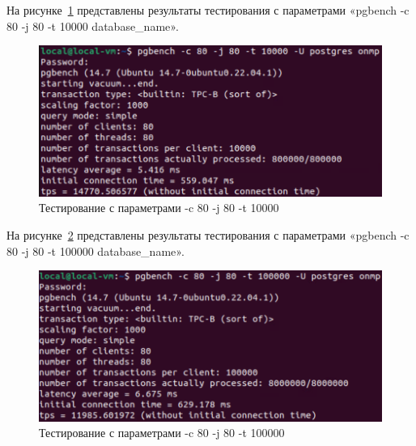 На рисунке~\ref{fig:b16} представлены результаты тестирования с параметрами «pgbench -c 80 -j 80 -t 10000 database\_name».

\begin{figure}
    \includegraphics[width=16.5cm]{inc/test2_8}
    \caption{Тестирование с параметрами -c 80 -j 80 -t 10000}
    \label{fig:b16}
\end{figure}

На рисунке~\ref{fig:b17} представлены результаты тестирования с параметрами «pgbench -c 80 -j 80 -t 100000 database\_name».

\begin{figure}
    \includegraphics[width=16.5cm]{inc/test2_9}
    \caption{Тестирование с параметрами -c 80 -j 80 -t 100000}
    \label{fig:b17}
\end{figure}
